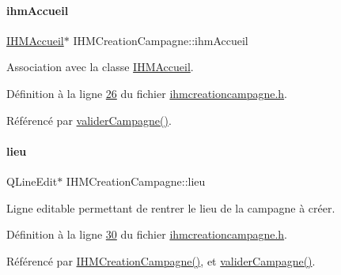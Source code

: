 \paragraph{\texorpdfstring{ihm\+Accueil}{ihmAccueil}}
{\footnotesize\ttfamily \hyperlink{class_i_h_m_accueil}{I\+H\+M\+Accueil}$\ast$ I\+H\+M\+Creation\+Campagne\+::ihm\+Accueil\hspace{0.3cm}{\ttfamily [private]}}



Association avec la classe \hyperlink{class_i_h_m_accueil}{I\+H\+M\+Accueil}. 



Définition à la ligne \hyperlink{ihmcreationcampagne_8h_source_l00026}{26} du fichier \hyperlink{ihmcreationcampagne_8h_source}{ihmcreationcampagne.\+h}.



Référencé par \hyperlink{ihmcreationcampagne_8cpp_source_l00071}{valider\+Campagne()}.

\mbox{\label{class_i_h_m_creation_campagne_af68a722acc97a1011ff82752169a2ac8}} 
\paragraph{\texorpdfstring{lieu}{lieu}}
{\footnotesize\ttfamily Q\+Line\+Edit$\ast$ I\+H\+M\+Creation\+Campagne\+::lieu\hspace{0.3cm}{\ttfamily [private]}}



Ligne editable permettant de rentrer le lieu de la campagne à créer. 



Définition à la ligne \hyperlink{ihmcreationcampagne_8h_source_l00030}{30} du fichier \hyperlink{ihmcreationcampagne_8h_source}{ihmcreationcampagne.\+h}.



Référencé par \hyperlink{ihmcreationcampagne_8cpp_source_l00011}{I\+H\+M\+Creation\+Campagne()}, et \hyperlink{ihmcreationcampagne_8cpp_source_l00071}{valider\+Campagne()}.

\mbox{\label{class_i_h_m_creation_campagne_aee78d20f0263359283cbcbc50fac3143}} 
